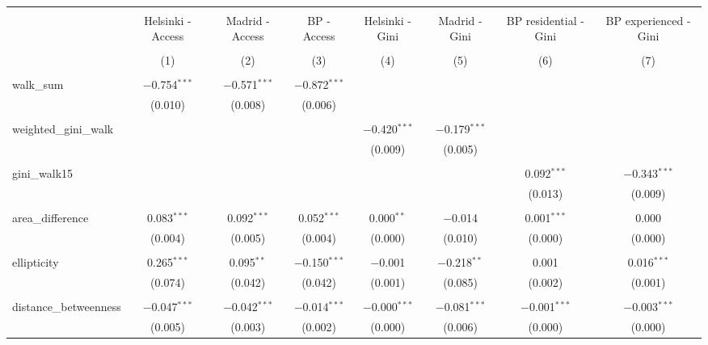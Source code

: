
\begin{table}[!htbp] \centering 
  \caption{} 
  \label{} 
\begin{tabular}{@{\extracolsep{5pt}}lccccccc} 
\\[-1.8ex]\hline 
\hline \\[-1.8ex] 
 & Helsinki - Access & Madrid - Access & BP - Access & Helsinki - Gini & Madrid - Gini & BP residential - Gini & BP experienced - Gini \\ 
\\[-1.8ex] & (1) & (2) & (3) & (4) & (5) & (6) & (7)\\ 
\hline \\[-1.8ex] 
 walk\_sum & $-$0.754$^{***}$ & $-$0.571$^{***}$ & $-$0.872$^{***}$ &  &  &  &  \\ 
  & (0.010) & (0.008) & (0.006) &  &  &  &  \\ 
  & & & & & & & \\ 
 weighted\_gini\_walk &  &  &  & $-$0.420$^{***}$ & $-$0.179$^{***}$ &  &  \\ 
  &  &  &  & (0.009) & (0.005) &  &  \\ 
  & & & & & & & \\ 
 gini\_walk15 &  &  &  &  &  & 0.092$^{***}$ & $-$0.343$^{***}$ \\ 
  &  &  &  &  &  & (0.013) & (0.009) \\ 
  & & & & & & & \\ 
 area\_difference & 0.083$^{***}$ & 0.092$^{***}$ & 0.052$^{***}$ & 0.000$^{**}$ & $-$0.014 & 0.001$^{***}$ & 0.000 \\ 
  & (0.004) & (0.005) & (0.004) & (0.000) & (0.010) & (0.000) & (0.000) \\ 
  & & & & & & & \\ 
 ellipticity & 0.265$^{***}$ & 0.095$^{**}$ & $-$0.150$^{***}$ & $-$0.001 & $-$0.218$^{**}$ & 0.001 & 0.016$^{***}$ \\ 
  & (0.074) & (0.042) & (0.042) & (0.001) & (0.085) & (0.002) & (0.001) \\ 
  & & & & & & & \\ 
 distance\_betweenness & $-$0.047$^{***}$ & $-$0.042$^{***}$ & $-$0.014$^{***}$ & $-$0.000$^{***}$ & $-$0.081$^{***}$ & $-$0.001$^{***}$ & $-$0.003$^{***}$ \\ 
  & (0.005) & (0.003) & (0.002) & (0.000) & (0.006) & (0.000) & (0.000) \\ 

\end{tabular}
\end{table}
